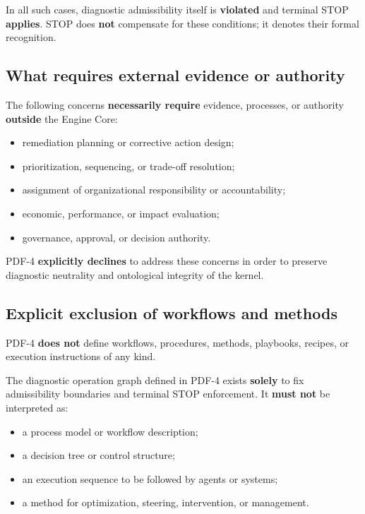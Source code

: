 In all such cases,
diagnostic admissibility itself
is \textbf{violated}
and terminal STOP \textbf{applies}.
STOP does \textbf{not} compensate
for these conditions;
it denotes their formal recognition.

\subsection{What requires external evidence or authority}

The following concerns
\textbf{necessarily require}
evidence, processes,
or authority \textbf{outside}
the Engine Core:
\begin{itemize}
  \item remediation planning
        or corrective action design;
  \item prioritization,
        sequencing,
        or trade-off resolution;
  \item assignment of organizational
        responsibility or accountability;
  \item economic, performance,
        or impact evaluation;
  \item governance, approval,
        or decision authority.
\end{itemize}

PDF-4 \textbf{explicitly declines}
to address these concerns
in order to preserve
diagnostic neutrality
and ontological integrity
of the kernel.

\subsection{Explicit exclusion of workflows and methods}

PDF-4 \textbf{does not} define
workflows, procedures,
methods, playbooks,
recipes, or execution instructions
of any kind.

The diagnostic operation graph
defined in PDF-4 exists
\textbf{solely} to fix
admissibility boundaries
and terminal STOP enforcement.
It \textbf{must not} be interpreted as:
\begin{itemize}
  \item a process model
        or workflow description;
  \item a decision tree
        or control structure;
  \item an execution sequence
        to be followed
        by agents or systems;
  \item a method for optimization,
        steering, intervention,
        or management.
\end{itemize}

